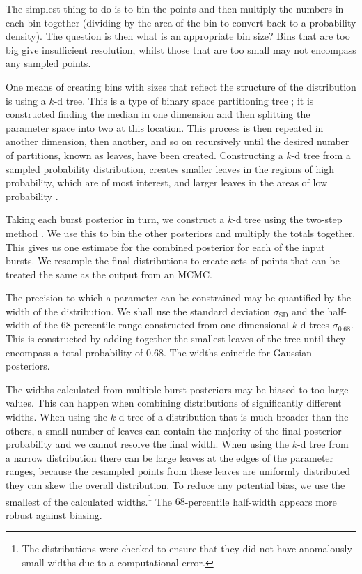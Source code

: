 \documentclass[useAMS,usedcolumn,usegraphicx,usenatbib]{mn2e}
\newcommand{\sub}[1]{\ensuremath{_\mathrm{#1}}}
\begin{document}
The simplest thing to do is to bin the points and then multiply the numbers in each bin together (dividing by the area of the bin to convert back to a probability density). The question is then what is an appropriate bin size? Bins that are too big give insufficient resolution, whilst those that are too small may not encompass any sampled points.

One means of creating bins with sizes that reflect the structure of the distribution is using a $k$-d tree. This is a type of binary space partitioning tree \citep[sections 5.2, 12.1, 12.3]{Berg2008}; it is constructed finding the median in one dimension and then splitting the parameter space into two at this location. This process is then repeated in another dimension, then another, and so on recursively until the desired number of partitions, known as leaves, have been created. Constructing a $k$-d tree from a sampled probability distribution, creates smaller leaves in the regions of high probability, which are of most interest, and larger leaves in the areas of low probability \citep{Weinberg2012}.

Taking each burst posterior in turn, we construct a $k$-d tree using the two-step method \citep*{Sidery2013}. We use this to bin the other posteriors and multiply the totals together. This gives us one estimate for the combined posterior for each of the input bursts. We resample the final distributions to create sets of points that can be treated the same as the output from an MCMC.

The precision to which a parameter can be constrained may be quantified by the width of the distribution. We shall use the standard deviation $\sigma\sub{SD}$ and the half-width of the $68$-percentile range constructed from one-dimensional $k$-d trees $\sigma_{0.68}$. This is constructed by adding together the smallest leaves of the tree until they encompass a total probability of $0.68$. The widths coincide for Gaussian posteriors.

The widths calculated from multiple burst posteriors may be biased to too large values. This can happen when combining distributions of significantly different widths. When using the $k$-d tree of a distribution that is much broader than the others, a small number of leaves can contain the majority of the final posterior probability and we cannot resolve the final width. When using the $k$-d tree from a narrow distribution there can be large leaves at the edges of the parameter ranges, because the resampled points from these leaves are uniformly distributed they can skew the overall distribution. To reduce any potential bias, we use the smallest of the calculated widths.\footnote{The distributions were checked to ensure that they did not have anomalously small widths due to a computational error.} The $68$-percentile half-width appears more robust against biasing.
\end{document}
